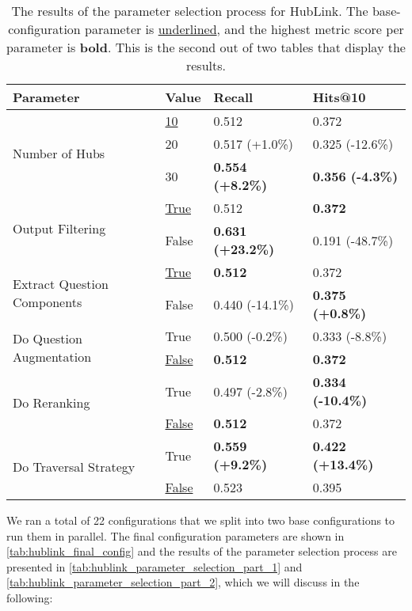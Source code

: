 \begin{table}[t]
    \centering
    \begin{tabular}{l l l l}
        \toprule
        \textbf{Parameter} & \textbf{Value} & \textbf{Recall} & \textbf{Hits@10} \\
        \midrule
        \multirow{3}{*}{Number of Hubs} 
            & \underline{10} & 0.512 & 0.372 \\
            & 20 & 0.517 (+1.0\%) & 0.325 (-12.6\%) \\
            & 30 & \textbf{0.554 (+8.2\%)} & \textbf{0.356 (-4.3\%)} \\
        \midrule
        \multirow{2}{*}{Output Filtering} 
            & \underline{True}  & 0.512 & \textbf{0.372} \\
            & False & \textbf{0.631 (+23.2\%)} & 0.191 (-48.7\%) \\
        \midrule
        \multirow{2}{*}{Extract Question Components} 
            & \underline{True} & \textbf{0.512} & 0.372 \\
            & False & 0.440 (-14.1\%) & \textbf{0.375 (+0.8\%)} \\
        \midrule
        \multirow{2}{*}{Do Question Augmentation} 
            & True & 0.500 (-0.2\%) & 0.333 (-8.8\%) \\
            & \underline{False} & \textbf{0.512} & \textbf{0.372} \\
        \midrule
        \multirow{2}{*}{Do Reranking} 
            & True & 0.497 (-2.8\%) & \textbf{0.334 (-10.4\%)} \\
            & \underline{False} & \textbf{0.512} & 0.372 \\
        \midrule
        \multirow{2}{*}{Do Traversal Strategy} 
            & True & \textbf{0.559 (+9.2\%)} & \textbf{0.422 (+13.4\%)} \\
            & \underline{False} & 0.523 & 0.395 \\
        \bottomrule
    \end{tabular}
    \caption[Results of the Parameter Selection Process for HubLink Part 2]{The results of the parameter selection process for HubLink. The base-configuration parameter is \underline{underlined}, and the highest metric score per parameter is \textbf{bold}. This is the second out of two tables that display the results.}
    \label{tab:hublink_parameter_selection_part_2}
\end{table}

We ran a total of 22 configurations that we split into two base configurations to run them in parallel. The final configuration parameters are shown in \autoref{tab:hublink_final_config} and the results of the parameter selection process are presented in \autoref{tab:hublink_parameter_selection_part_1} and \autoref{tab:hublink_parameter_selection_part_2}, which we will discuss in the following:


